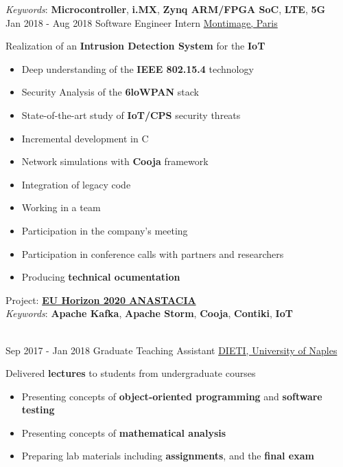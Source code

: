 \documentclass[letterpaper]{twentysecondcv} %
\begin{document}
\begin{twenty}
{            \textit{Keywords}: \textbf{Microcontroller}, \textbf{i.MX}, \textbf{Zynq ARM/FPGA SoC}, \textbf{LTE}, \textbf{5G}
        }\\
    \twentyitem
    	{Jan 2018 -}
		{Aug 2018}
        {Software Engineer Intern}
        {\href{https://www.montimage.com/}{Montimage, Paris}}
        {}
        {
            Realization of an \textbf{Intrusion Detection System} for the \textbf{IoT}
            \begin{itemize}
                \item Deep understanding of the \textbf{IEEE 802.15.4} technology 
                \item Security Analysis of the \textbf{6loWPAN} stack
                \item State-of-the-art study of \textbf{IoT/CPS} security threats
                \item Incremental development in C
                \item Network simulations with \textbf{Cooja} framework
                \item Integration of legacy code
                \item Working in a team
                \item Participation in the company's meeting
                \item Participation in conference calls with partners and researchers
                \item Producing \textbf{technical ocumentation}
            \end{itemize}
            Project: \href{http://www.anastacia-h2020.eu/}{\textbf{EU Horizon 2020 ANASTACIA}}\\
            \textit{Keywords}: \textbf{Apache Kafka}, \textbf{Apache Storm}, \textbf{Cooja}, \textbf{Contiki}, \textbf{IoT}
        }\\
    \twentyitem
   		{Sep 2017 -}
		{Jan 2018}
        {Graduate Teaching Assistant}
        {\href{http://www.scuolapsb.unina.it/}{DIETI, University of Naples}}
        {}
        {
            Delivered \textbf{lectures} to students from undergraduate courses
            \begin{itemize}
                \item Presenting concepts of \textbf{object-oriented programming} and \textbf{software testing}
                \item Presenting concepts of \textbf{mathematical analysis}
                \item Preparing lab materials including \textbf{assignments}, and the \textbf{final exam}
            \end{itemize}
        }
\end{twenty}
\end{document}
